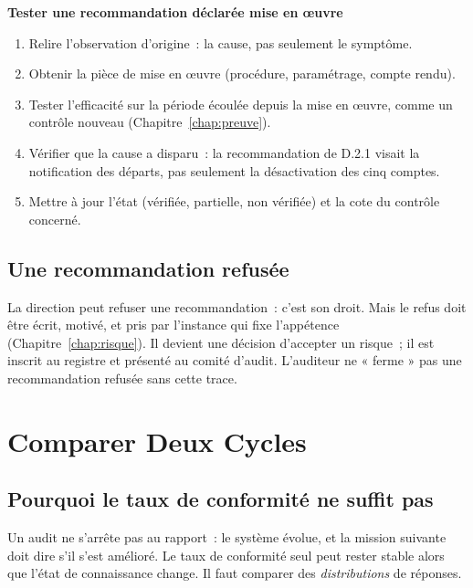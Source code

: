 \begin{boxprocedure}
\textbf{Tester une recommandation déclarée mise en œuvre}
\begin{enumerate}
    \item Relire l'observation d'origine~: la cause, pas seulement le
          symptôme.
    \item Obtenir la pièce de mise en œuvre (procédure, paramétrage,
          compte rendu).
    \item Tester l'efficacité sur la période écoulée depuis la mise en
          œuvre, comme un contrôle nouveau (Chapitre~\ref{chap:preuve}).
    \item Vérifier que la cause a disparu~: la recommandation de D.2.1
          visait la notification des départs, pas seulement la
          désactivation des cinq comptes.
    \item Mettre à jour l'état (vérifiée, partielle, non vérifiée) et la
          cote du contrôle concerné.
\end{enumerate}
\end{boxprocedure}

\subsection{Une recommandation refusée}

La direction peut refuser une recommandation~: c'est son droit. Mais le
refus doit être écrit, motivé, et pris par l'instance qui fixe l'appétence
(Chapitre~\ref{chap:risque}). Il devient une décision d'accepter un risque~;
il est inscrit au registre et présenté au comité d'audit. L'auditeur ne
« ferme » pas une recommandation refusée sans cette trace.

\section{Comparer Deux Cycles}
\label{sec:c12-dkl}

\subsection{Pourquoi le taux de conformité ne suffit pas}

Un audit ne s'arrête pas au rapport~: le système évolue, et la mission
suivante doit dire s'il s'est amélioré. Le taux de conformité seul peut
rester stable alors que l'état de connaissance change. Il faut comparer des
\emph{distributions} de réponses.

